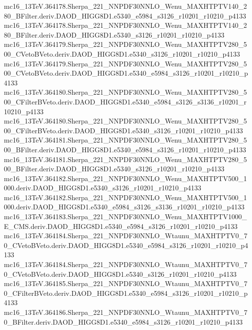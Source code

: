 \begin{footnotesize}
mc16\_13TeV.364178.Sherpa\_221\_NNPDF30NNLO\_Wenu\_MAXHTPTV140\_280\_BFilter.deriv.DAOD\_HIGG8D1.e5340\_e5984\_s3126\_r10201\_r10210\_p4133 \\
mc16\_13TeV.364178.Sherpa\_221\_NNPDF30NNLO\_Wenu\_MAXHTPTV140\_280\_BFilter.deriv.DAOD\_HIGG8D1.e5340\_s3126\_r10201\_r10210\_p4133 \\
mc16\_13TeV.364179.Sherpa\_221\_NNPDF30NNLO\_Wenu\_MAXHTPTV280\_500\_CVetoBVeto.deriv.DAOD\_HIGG8D1.e5340\_s3126\_r10201\_r10210\_p4133 \\
mc16\_13TeV.364179.Sherpa\_221\_NNPDF30NNLO\_Wenu\_MAXHTPTV280\_500\_CVetoBVeto.deriv.DAOD\_HIGG8D1.e5340\_e5984\_s3126\_r10201\_r10210\_p4133 \\
mc16\_13TeV.364180.Sherpa\_221\_NNPDF30NNLO\_Wenu\_MAXHTPTV280\_500\_CFilterBVeto.deriv.DAOD\_HIGG8D1.e5340\_e5984\_s3126\_s3136\_r10201\_r10210\_p4133 \\
mc16\_13TeV.364180.Sherpa\_221\_NNPDF30NNLO\_Wenu\_MAXHTPTV280\_500\_CFilterBVeto.deriv.DAOD\_HIGG8D1.e5340\_s3126\_r10201\_r10210\_p4133 \\
mc16\_13TeV.364181.Sherpa\_221\_NNPDF30NNLO\_Wenu\_MAXHTPTV280\_500\_BFilter.deriv.DAOD\_HIGG8D1.e5340\_e5984\_s3126\_r10201\_r10210\_p4133 \\
mc16\_13TeV.364181.Sherpa\_221\_NNPDF30NNLO\_Wenu\_MAXHTPTV280\_500\_BFilter.deriv.DAOD\_HIGG8D1.e5340\_s3126\_r10201\_r10210\_p4133 \\
mc16\_13TeV.364182.Sherpa\_221\_NNPDF30NNLO\_Wenu\_MAXHTPTV500\_1000.deriv.DAOD\_HIGG8D1.e5340\_s3126\_r10201\_r10210\_p4133 \\
mc16\_13TeV.364182.Sherpa\_221\_NNPDF30NNLO\_Wenu\_MAXHTPTV500\_1000.deriv.DAOD\_HIGG8D1.e5340\_e5984\_s3126\_s3136\_r10201\_r10210\_p4133 \\
mc16\_13TeV.364183.Sherpa\_221\_NNPDF30NNLO\_Wenu\_MAXHTPTV1000\_E\_CMS.deriv.DAOD\_HIGG8D1.e5340\_e5984\_s3126\_r10201\_r10210\_p4133 \\
mc16\_13TeV.364184.Sherpa\_221\_NNPDF30NNLO\_Wtaunu\_MAXHTPTV0\_70\_CVetoBVeto.deriv.DAOD\_HIGG8D1.e5340\_e5984\_s3126\_r10201\_r10210\_p4133 \\
mc16\_13TeV.364184.Sherpa\_221\_NNPDF30NNLO\_Wtaunu\_MAXHTPTV0\_70\_CVetoBVeto.deriv.DAOD\_HIGG8D1.e5340\_s3126\_r10201\_r10210\_p4133 \\
mc16\_13TeV.364185.Sherpa\_221\_NNPDF30NNLO\_Wtaunu\_MAXHTPTV0\_70\_CFilterBVeto.deriv.DAOD\_HIGG8D1.e5340\_e5984\_s3126\_r10201\_r10210\_p4133 \\
mc16\_13TeV.364186.Sherpa\_221\_NNPDF30NNLO\_Wtaunu\_MAXHTPTV0\_70\_BFilter.deriv.DAOD\_HIGG8D1.e5340\_e5984\_s3126\_r10201\_r10210\_p4133 \\

\end{footnotesize}
